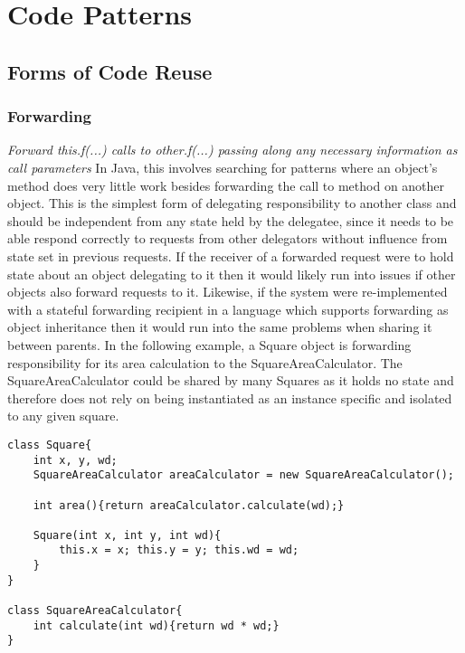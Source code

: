 \chapter{Code Patterns}\label{C:bg}

\section{Forms of Code Reuse}
\subsection{Forwarding}
\textit{Forward this.f(...) calls to other.f(...) passing along any necessary information as call parameters} \newline\newline
In Java, this involves searching for patterns where an object’s method does very little work besides forwarding the call to method on another object. This is the simplest form of delegating responsibility to another class and should be independent from any state held by the delegatee, since it needs to be able respond correctly to requests from other delegators without influence from state set in previous requests.\newline 
If the receiver of a forwarded request were to hold state about an object delegating to it then it would likely run into issues if other objects also forward requests to it. Likewise, if the system were re-implemented with a stateful forwarding recipient in a language which supports forwarding as object inheritance then it would run into the same problems when sharing it between parents.\newline
In the following example, a Square object is forwarding responsibility for its area calculation to the SquareAreaCalculator. The SquareAreaCalculator could be shared by many Squares as it holds no state and therefore does not rely on being instantiated as an instance specific and isolated to any given square.

\begin{lstlisting}
class Square{
	int x, y, wd;
	SquareAreaCalculator areaCalculator = new SquareAreaCalculator();
	
	int area(){return areaCalculator.calculate(wd);}
	
	Square(int x, int y, int wd){
		this.x = x; this.y = y; this.wd = wd;
	}
}

class SquareAreaCalculator{
	int calculate(int wd){return wd * wd;}
}
\end{lstlisting}

